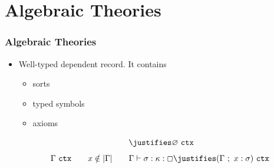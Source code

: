 \documentclass[t,12pt,numbers,fleqn,usenames,xcolor=dvipsnames]{beamer}
\begin{document}
\section{Algebraic Theories}
\begin{frame}[fragile]
\frametitle{Algebraic Theories}
\pause
\begin{itemize}
\item Well-typed dependent record. It contains	
	   \begin{itemize}
	   	\item sorts
	   	\item typed symbols
	   	\item axioms 
	   \end{itemize}
\scriptsize 
\begin{figure}[ht]
	\begin{proofrules}
		\[ \ \justifies \varnothing \ \wfctx \]
		\[ \Gamma\ \wfctx \qquad x\notin |\Gamma| 
		\qquad \Gamma \vdash \sigma : \kappa : \Box \justifies
		(\Gamma\ ;\ x : \sigma)\ \wfctx \]
	\end{proofrules}
	\label{fig:ctx}
\end{figure}   
\end{itemize}
\end{frame}

\end{document}
